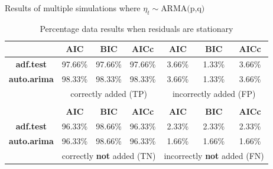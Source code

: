\documentclass[10pt]{beamer}
\begin{document}
\begin{frame}{Results of multiple simulations where $\eta_t\sim\text{ARMA(p,q)}$}

    \begin{table}
        \centering\small 
        \renewcommand{\arraystretch}{1.3}
        \setlength{\tabcolsep}{10pt}
        \label{simulations1}
        \caption{Percentage data results when residuals are stationary}
        \begin{tabular}{|c|ccc|ccc|}
            \cline{2-7}
            \multicolumn{1}{c|}{}   & \textbf{AIC}  & \textbf{BIC}  & \textbf{AICc}            & \textbf{AIC}      & \textbf{BIC}   & \textbf{AICc} \\
            \hline       
            \textbf{adf.test}       & 97.66\%       & 97.66\%        & 97.66\%                 & 3.66\%            & 1.33\%         & 3.66\%        \\
            \textbf{auto.arima}     & 98.33\%       & 98.33\%        & 98.33\%                 & 3.66\%            & 1.33\%         & 3.66\%        \\
            \hline
            \multicolumn{1}{|c|}{}   & \multicolumn{3}{c|}{correctly added (TP)}               & \multicolumn{3}{c|}{incorrectly added (FP)}         \\
            \hline 
            \multicolumn{7}{c}{}                                                                                                                    \\
            \cline{2-7}
            \multicolumn{1}{c|}{}   & \textbf{AIC}  & \textbf{BIC}  & \textbf{AICc}           & \textbf{AIC}      & \textbf{BIC}   & \textbf{AICc}  \\ 
            \hline        
            \textbf{adf.test}       & 96.33\%       & 98.66\%        & 96.33\%                & 2.33\%            & 2.33\%         & 2.33\%         \\
            \textbf{auto.arima}     & 96.33\%       & 98.66\%        & 96.33\%                & 1.66\%            & 1.66\%         & 1.66\%         \\
            \hline 
            \multicolumn{1}{|c|}{}   & \multicolumn{3}{c|}{correctly \textbf{not} added (TN)} & \multicolumn{3}{c|}{incorrectly \textbf{not} added (FN)}  \\
            \hline
        \end{tabular}
    \end{table}

\end{frame}
\end{document}
